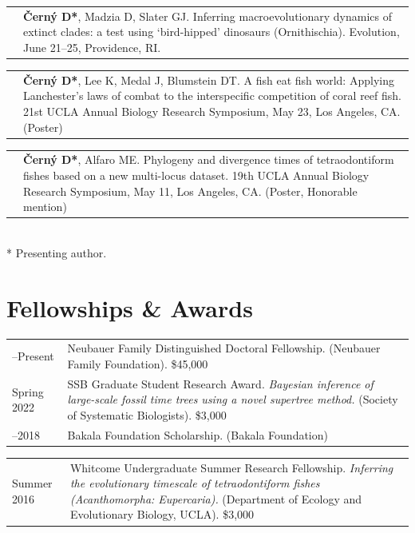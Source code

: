\documentclass[10pt]{article}
\begin{document}
\begin{tabularx}{\textwidth}{>{\raggedleft\arraybackslash}p{2.2cm} X}
2019 & \textbf{\v{C}ern\'{y} D*}, Madzia D, Slater GJ. Inferring macroevolutionary dynamics of extinct clades: a test using `bird-hipped' dinosaurs (Ornithischia). Evolution, June 21--25, Providence, RI.
\end{tabularx}
\begin{tabularx}{\textwidth}{>{\raggedleft\arraybackslash}p{2.2cm} X}
2018 & \textbf{\v{C}ern\'{y} D*}, Lee K, Medal J, Blumstein DT. A fish eat fish world: Applying Lanchester's laws of combat to the interspecific competition of coral reef fish. 21st UCLA Annual Biology Research Symposium, May 23, Los Angeles, CA. (Poster)
\end{tabularx}
\begin{tabularx}{\textwidth}{>{\raggedleft\arraybackslash}p{2.2cm} X}
2016 & \textbf{\v{C}ern\'{y} D*}, Alfaro ME. Phylogeny and divergence times of tetraodontiform fishes based on a new multi-locus dataset. 19th UCLA Annual Biology Research Symposium, May 11, Los Angeles, CA. (Poster, Honorable mention)
\end{tabularx} \\[1ex]

\hspace*{1.07cm} * Presenting author.

\section*{Fellowships \& Awards}

\begin{tabularx}{\textwidth}{>{\raggedleft\arraybackslash}p{2.2cm} X}
2018--Present & Neubauer Family Distinguished Doctoral Fellowship. (Neubauer Family Foundation). \$45,000 \\[0.55cm]
Spring 2022 & SSB Graduate Student Research Award. \textit{Bayesian inference of large-scale fossil time trees using a novel supertree method.} (Society of Systematic Biologists). \$3,000 \\[0.55cm]
2014--2018 & Bakala Foundation Scholarship. (Bakala Foundation) \\[0.1cm]
\end{tabularx}

\newpage

\noindent \begin{tabularx}{\textwidth}{>{\raggedleft\arraybackslash}p{2.2cm} X}
Summer 2016 & Whitcome Undergraduate Summer Research Fellowship. \textit{Inferring the evolutionary timescale of tetraodontiform fishes (Acanthomorpha: Eupercaria).} (Department of Ecology and Evolutionary Biology, UCLA). \$3,000
\end{tabularx}
\end{document}
